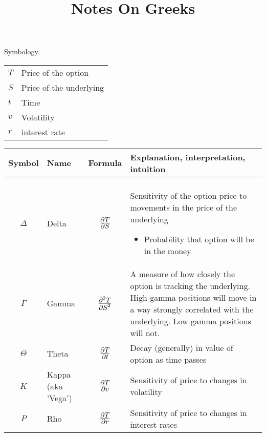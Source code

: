 \documentclass{article}
\title{Notes On Greeks}
\begin{document}
Symbology.

\begin{tabular}
{ l l }
$T$ & Price of the option \\
$S$ & Price of the underlying \\
$t$ & Time \\
$v$ & Volatility \\
$r$ & interest rate \\
\end{tabular}

\begin{tabular}
{ c l c p{2.8in} }
Symbol & Name & Formula & Explanation, interpretation, intuition \\
\hline \\
$\Delta$ & Delta & \begin{math}{\displaystyle \partial T }\over{\displaystyle \partial S}\end{math} & Sensitivity of the option price to movements in the price of the underlying \begin{itemize} \item Probability that option will be in the money \end{itemize} \\
$\Gamma$ & Gamma & ${\displaystyle \partial^{2} T} \over {\displaystyle \partial S ^{2}}$ & A measure of how closely the option is tracking the underlying.  High gamma positions will move in a way strongly correlated with the underlying.  Low gamma positions will not. \\
$\Theta$ & Theta & ${\displaystyle \partial T }\over {\displaystyle \partial t} $ & Decay (generally) in value of option as time passes \\
$K$ & Kappa (aka 'Vega') & $ {\displaystyle \partial T} \over {\displaystyle \partial v} $ & Sensitivity of price to changes in volatility \\
$P$ & Rho & ${\displaystyle \partial T }\over {\displaystyle \partial r} $ & Sensitivity of price to changes in interest rates \\
\end{tabular}
\end{document}
